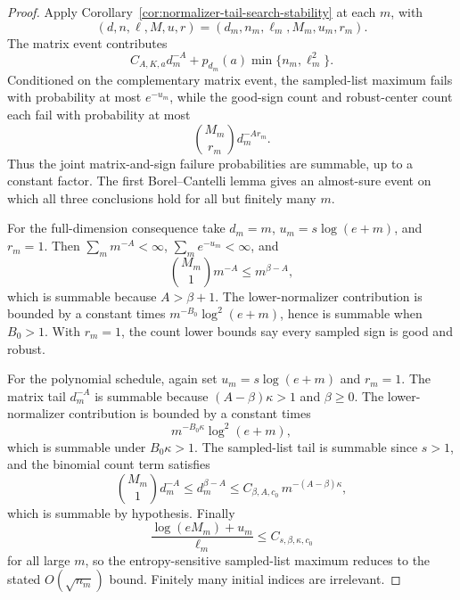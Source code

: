\documentclass[11pt]{amsart}
\numberwithin{equation}{section}
\theoremstyle{definition}
\theoremstyle{remark}
\begin{document}
\begin{proof}
Apply Corollary~\ref{cor:normalizer-tail-search-stability} at each \(m\), with
\[
  (d,n,\ell,M,u,r)=(d_m,n_m,\ell_m,M_m,u_m,r_m).
\]
The matrix event contributes
\[
  C_{A,K,a}d_m^{-A}+p_{d_m}(a)\min\{n_m,\ell_m^2\}.
\]
Conditioned on the complementary matrix event, the sampled-list maximum fails
with probability at most \(e^{-u_m}\), while the good-sign count and
robust-center count each fail with probability at most
\[
  \binom{M_m}{r_m}d_m^{-A r_m}.
\]
Thus the joint matrix-and-sign failure probabilities are summable, up to a
constant factor.  The first Borel--Cantelli lemma gives an almost-sure event on
which all three conclusions hold for all but finitely many \(m\).

For the full-dimension consequence take \(d_m=m\), \(u_m=s\log(e+m)\), and
\(r_m=1\).  Then \(\sum_m m^{-A}<\infty\), \(\sum_m e^{-u_m}<\infty\), and
\[
  \binom{M_m}{1}m^{-A}\le m^{\beta-A},
\]
which is summable because \(A>\beta+1\).  The lower-normalizer contribution is
bounded by a constant times \(m^{-B_0}\log^2(e+m)\), hence is summable when
\(B_0>1\).  With \(r_m=1\), the count lower bounds say every sampled sign is
good and robust.

For the polynomial schedule, again set \(u_m=s\log(e+m)\) and \(r_m=1\).  The
matrix tail \(d_m^{-A}\) is summable because \((A-\beta)\kappa>1\) and
\(\beta\ge0\).  The lower-normalizer contribution is bounded by a constant times
\[
  m^{-B_0\kappa}\log^2(e+m),
\]
which is summable under \(B_0\kappa>1\).  The sampled-list tail is summable since
\(s>1\), and the binomial count term satisfies
\[
  \binom{M_m}{1}d_m^{-A}\le d_m^{\beta-A}
  \le C_{\beta,A,c_0}\,m^{-(A-\beta)\kappa},
\]
which is summable by hypothesis.  Finally
\[
  \frac{\log(eM_m)+u_m}{\ell_m}
  \le C_{s,\beta,\kappa,c_0}
\]
for all large \(m\), so the entropy-sensitive sampled-list maximum reduces to
the stated \(O(\sqrt{n_m})\) bound.  Finitely many initial indices are irrelevant.
\end{proof}
\end{document}
